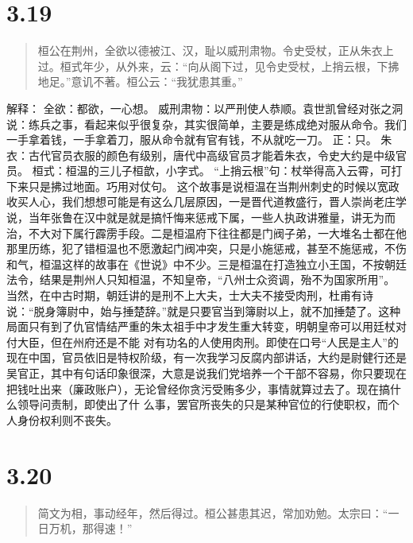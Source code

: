 \documentclass[]{book}
\begin{document}
\section{3.19}\label{section-173}

\begin{quote}
桓公在荆州，全欲以德被江、汉，耻以威刑肃物。令史受杖，正从朱衣上过。桓式年少，从外来，云：``向从阁下过，见令史受杖，上捎云根，下拂地足。''意讥不著。桓公云：``我犹患其重。''
\end{quote}

解释： 全欲：都欲，一心想。
威刑肃物：以严刑使人恭顺。袁世凯曾经对张之洞说：练兵之事，看起来似乎很复杂，其实很简单，主要是练成绝对服从命令。我们一手拿着钱，一手拿着刀，服从命令就有官有钱，不从就吃一刀。
正：只。
朱衣：古代官员衣服的颜色有级别，唐代中高级官员才能着朱衣，令史大约是中级官员。
桓式：桓温的三儿子桓歆，小字式。
``上捎云根''句：杖举得高入云霄，可打下来只是拂过地面。巧用对仗句。
这个故事是说桓温在当荆州刺史的时候以宽政收买人心，我们想想可能是有这么几层原因，一是晋代道教盛行，晋人崇尚老庄学说，当年张鲁在汉中就是就是搞忏悔来惩戒下属，一些人执政讲雅量，讲无为而治，不大对下属行霹雳手段。二是桓温府下往往都是门阀子弟，一大堆名士都在他那里历练，犯了错桓温也不愿激起门阀冲突，只是小施惩戒，甚至不施惩戒，不伤和气，桓温这样的故事在《世说》中不少。三是桓温在打造独立小王国，不按朝廷法令，结果是荆州人只知桓温，不知皇帝，``八州士众资调，殆不为国家所用''。
当然，在中古时期，朝廷讲的是刑不上大夫，士大夫不接受肉刑，杜甫有诗说：``脱身簿尉中，始与捶楚辞。''就是只要官当到簿尉以上，就不加捶楚了。这种局面只有到了仇官情结严重的朱太祖手中才发生重大转变，明朝皇帝可以用廷杖对付大臣，但在州府还是不能
对有功名的人使用肉刑。即使在口号``人民是主人''的现在中国，官员依旧是特权阶级，有一次我学习反腐内部讲话，大约是尉健行还是吴官正，其中有句话印象很深，大意是说我们党培养一个干部不容易，你只要现在把钱吐出来（廉政账户），无论曾经你贪污受贿多少，事情就算过去了。现在搞什么领导问责制，即使出了什
么事，罢官所丧失的只是某种官位的行使职权，而个人身份权利则不丧失。

\section{3.20}\label{section-174}

\begin{quote}
简文为相，事动经年，然后得过。桓公甚患其迟，常加劝勉。太宗曰：``一日万机，那得速！''
\end{quote}
\end{document}
